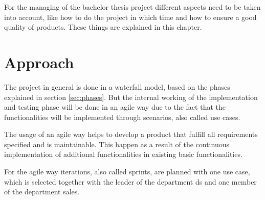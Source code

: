 For the managing of the bachelor thesis project different aspects need to be taken into account, like how to do the project in which time and how to ensure a good quality of products. These things are explained in this chapter.

\section{Approach}
The project in general is done in a waterfall model, based on the phases explained in section \ref{sec:phases}. But the internal working of the implementation and testing phase will be done in an agile way due to the fact that the functionalities will be implemented through scenarios, also called use cases.

The usage of an agile way helps to develop a product that fulfill all requirements specified and is maintainable. This happen as a result of the continuous implementation of additional functionalities in existing basic functionalities. 

For the agile way iterations, also called sprints, are planned with one use case, which is selected together with the leader of the department \gls{ds} and one member of the department sales. 


